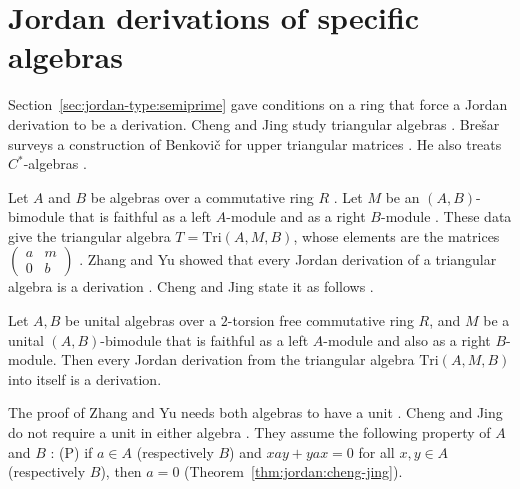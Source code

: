 \section{Jordan derivations of specific algebras}\label{sec:jordan-type:jordan-on-algebras}

Section~\ref{sec:jordan-type:semiprime} gave conditions on a ring that force a Jordan derivation to be
a derivation. Cheng and Jing study triangular algebras \cite[p.~1]{ChengJing2007}. Brešar surveys a construction of
Benkovič for upper triangular matrices \cite[\S4.1, p.~418]{Bresar2005}. He also treats $C^{*}$-algebras
\cite[Section~5, p.~421]{Bresar2005}.

Let $A$ and $B$ be algebras over a commutative ring $R$ \cite[p.~2]{ChengJing2007}. Let $M$ be an
$(A,B)$-bimodule that is faithful as a left $A$-module and as a right $B$-module
\cite[p.~2]{ChengJing2007}. These data give the triangular algebra $T=\mathrm{Tri}(A,M,B)$, whose elements are the
matrices $\begin{pmatrix}a&m\\0&b\end{pmatrix}$ \cite[p.~2]{ChengJing2007}.
Zhang and Yu showed that every Jordan derivation of a triangular algebra is a derivation
\cite[p.~1]{ChengJing2007}. Cheng and Jing state it as follows \cite[p.~1]{ChengJing2007}.

\begin{theorem}\label{thm:jordan:zhang-yu}
Let $A,B$ be unital algebras over a $2$-torsion free commutative ring $R$, and $M$ be a unital
$(A,B)$-bimodule that is faithful as a left $A$-module and also as a right $B$-module. Then every
Jordan derivation from the triangular algebra $\mathrm{Tri}(A,M,B)$ into itself is a derivation.
\end{theorem}

The proof of Zhang and Yu needs both algebras to have a unit \cite[p.~1]{ChengJing2007}.
Cheng and Jing do not require a unit in either algebra \cite[p.~1]{ChengJing2007}. They assume the following property of $A$ and $B$
\cite[Section~2, p.~2]{ChengJing2007}: (P) if $a\in A$ (respectively $B$) and $xay+yax=0$ for all
$x,y\in A$ (respectively $B$), then $a=0$ (Theorem~\ref{thm:jordan:cheng-jing}).

